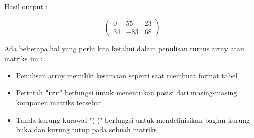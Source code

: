 Hasil output :

\begin{displaymath}
\left (
\begin{array}{rrr}
0 & 55 & 23 \\
34 & -83 & 68 \end{array}
\right )
\end{displaymath}

Ada beberapa hal yang perlu kita ketahui dalam penulisan rumus array atau matriks ini :
\begin{itemize}
\item Penulisan array memiliki kesamaan seperti saat membuat format tabel
\item Perintah \textbf{"rrr"} berfungsi untuk menentukan posisi dari masing-masing komponen matriks tersebut
\item Tanda kurung kurawal "( )" berfungsi untuk mendefinisikan bagian kurung buka dan kurung tutup pada sebuah matriks  
\end{itemize}



